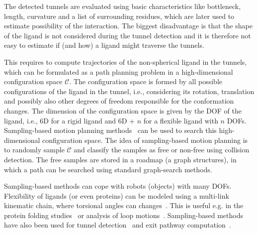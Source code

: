 \documentclass{svmult}
\def\C{\mathcal{C}}
\begin{document}
The detected tunnels are evaluated using basic characteristics like bottleneck, length, curvature and a list of surrounding
residues, which are later used to estimate possibility of the interaction.
The biggest disadvantage is that the shape of the ligand is not considered during the tunnel detection and it is therefore
not easy to estimate if (and how) a ligand might traverse the tunnels.

This requires to compute trajectories of the non-spherical ligand in the tunnels, which can be formulated as a path planning problem in a high-dimensional configuration space $\C$.
The configuration space is formed by all possible configurations of the ligand in the tunnel, i.e., considering its rotation, translation and possibly also other degrees of freedom responsible for the conformation changes.
The dimension of the configuration space is given by the DOF of the ligand, i.e., 6D for a rigid ligand and 6D + $n$ for a flexible
ligand with $n$ DOFs.
Sampling-based motion planning methods~\cite{Lav06} can be used to search this high-dimensional configuration space.
The idea of sampling-based motion planning is to randomly sample $\C$ and classify the samples as free or non-free using collision detection.
The free samples are stored in a roadmap (a graph structures), in which a path can be searched using standard graph-search methods.

Sampling-based methods can cope with robots (objects) with many DOFs. 
Flexibility of ligands (or even proteins) can be modeled using a multi-link kinematic chain, where torsional angles
can changes~\cite{songPFpath}.
This is useful e.g. in the protein folding studies~\cite{al2012motion,gipson2012computational,amato2002using,raveh2009rapid,novinskaya2015improving,songPFintro} or analysis of loop motions~\cite{cortes2004geometric}.
Sampling-based methods have also been used for 
 tunnel detection~\cite{vonasek2016application,vonasek2017tunnel} and
 exit pathway computation~\cite{cortes2010simulating,guieysse2008structure}.
\end{document}
